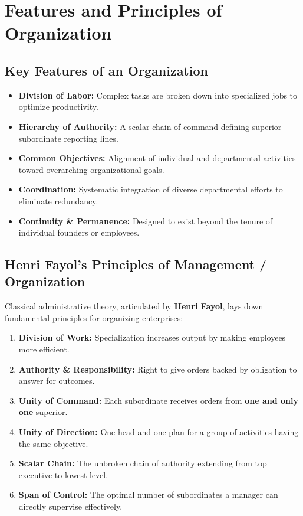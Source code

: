 \documentclass[11pt,a4paper]{article}
\begin{document}
\section{Features and Principles of Organization}

\subsection{Key Features of an Organization}
\begin{itemize}[leftmargin=*, itemsep=4pt]
  \item \textbf{Division of Labor:} Complex tasks are broken down into specialized jobs to optimize productivity.
  \item \textbf{Hierarchy of Authority:} A scalar chain of command defining superior-subordinate reporting lines.
  \item \textbf{Common Objectives:} Alignment of individual and departmental activities toward overarching organizational goals.
  \item \textbf{Coordination:} Systematic integration of diverse departmental efforts to eliminate redundancy.
  \item \textbf{Continuity \& Permanence:} Designed to exist beyond the tenure of individual founders or employees.
\end{itemize}

\subsection{Henri Fayol's Principles of Management / Organization}
Classical administrative theory, articulated by \textbf{Henri Fayol}, lays down fundamental principles for organizing enterprises:

\begin{tcolorbox}[formulabox, title={Core Administrative Principles (Fayol)}]
  \begin{enumerate}[leftmargin=*, itemsep=3pt]
    \item \textbf{Division of Work:} Specialization increases output by making employees more efficient.
    \item \textbf{Authority \& Responsibility:} Right to give orders backed by obligation to answer for outcomes.
    \item \textbf{Unity of Command:} Each subordinate receives orders from \textbf{one and only one} superior.
    \item \textbf{Unity of Direction:} One head and one plan for a group of activities having the same objective.
    \item \textbf{Scalar Chain:} The unbroken chain of authority extending from top executive to lowest level.
    \item \textbf{Span of Control:} The optimal number of subordinates a manager can directly supervise effectively.
  \end{enumerate}
\end{tcolorbox}
\end{document}
